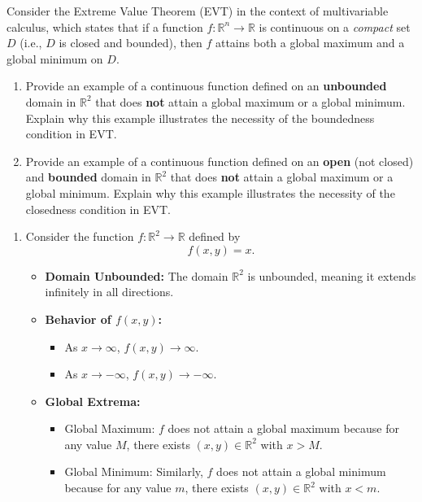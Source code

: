 \exampleline
\begin{example}
Consider the Extreme Value Theorem (EVT)  in the context of multivariable calculus, which states that if a function \( f: \mathbb{R}^n \to \mathbb{R} \) is continuous on a \textit{compact} set \( D \) (i.e., \( D \) is closed and bounded), then \( f \) attains both a global maximum and a global minimum on \( D \).

\begin{enumerate}
    \item Provide an example of a continuous function defined on an \textbf{unbounded} domain in \( \mathbb{R}^2 \) that does \textbf{not} attain a global maximum or a global minimum. Explain why this example illustrates the necessity of the boundedness condition in EVT.
    
    \item Provide an example of a continuous function defined on an \textbf{open} (not closed) and \textbf{bounded} domain in \( \mathbb{R}^2 \) that does \textbf{not} attain a global maximum or a global minimum. Explain why this example illustrates the necessity of the closedness condition in EVT.
\end{enumerate}


\begin{solution}
\begin{enumerate}
\item Consider the function \( f: \mathbb{R}^2 \to \mathbb{R} \) defined by
\[
f(x, y) = x.
\]

\begin{itemize}
    \item \textbf{Domain Unbounded:} The domain \( \mathbb{R}^2 \) is unbounded, meaning it extends infinitely in all directions.
    
    \item \textbf{Behavior of \( f(x, y) \):}
    \begin{itemize}
        \item As \( x \to \infty \), \( f(x, y) \to \infty \).
        \item As \( x \to -\infty \), \( f(x, y) \to -\infty \).
    \end{itemize}
    
    \item \textbf{Global Extrema:} 
    \begin{itemize}
        \item Global Maximum: \( f \) does not attain a global maximum because for any value \( M \), there exists \( (x, y) \in \mathbb{R}^2 \) with \( x > M \).
        \item Global Minimum: Similarly, \( f \) does not attain a global minimum because for any value \( m \), there exists \( (x, y) \in \mathbb{R}^2 \) with \( x < m \).
    \end{itemize}
    

\end{itemize}
\end{enumerate}
\end{solution}
\end{example}
